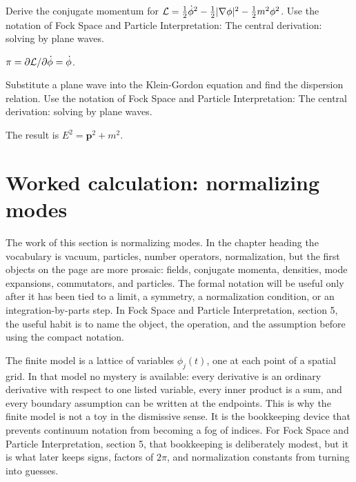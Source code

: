 \begin{exercise}
Derive the conjugate momentum for \(\mathcal L=\frac12\dot\phi^2-\frac12|\nabla\phi|^2-\frac12m^2\phi^2\).  Use the notation of Fock Space and Particle Interpretation: The central derivation: solving by plane waves.
\begin{answer}
\(\pi=\partial\mathcal L/\partial\dot\phi=\dot\phi\).
\end{answer}
\end{exercise}

\begin{exercise}
Substitute a plane wave into the Klein-Gordon equation and find the dispersion relation.  Use the notation of Fock Space and Particle Interpretation: The central derivation: solving by plane waves.
\begin{answer}
The result is \(E^2=\bm p^2+m^2\).
\end{answer}
\end{exercise}



\section{Worked calculation: normalizing modes}

The work of this section is normalizing modes.  In the chapter heading the vocabulary is vacuum, particles, number operators, normalization, but the first objects on the page are more prosaic: fields, conjugate momenta, densities, mode expansions, commutators, and particles.  The formal notation will be useful only after it has been tied to a limit, a symmetry, a normalization condition, or an integration-by-parts step.  In Fock Space and Particle Interpretation, section 5, the useful habit is to name the object, the operation, and the assumption before using the compact notation.

The finite model is a lattice of variables \(\phi_j(t)\), one at each point of a spatial grid.  In that model no mystery is available: every derivative is an ordinary derivative with respect to one listed variable, every inner product is a sum, and every boundary assumption can be written at the endpoints.  This is why the finite model is not a toy in the dismissive sense.  It is the bookkeeping device that prevents continuum notation from becoming a fog of indices.  For Fock Space and Particle Interpretation, section 5, that bookkeeping is deliberately modest, but it is what later keeps signs, factors of \(2\pi\), and normalization constants from turning into guesses.

